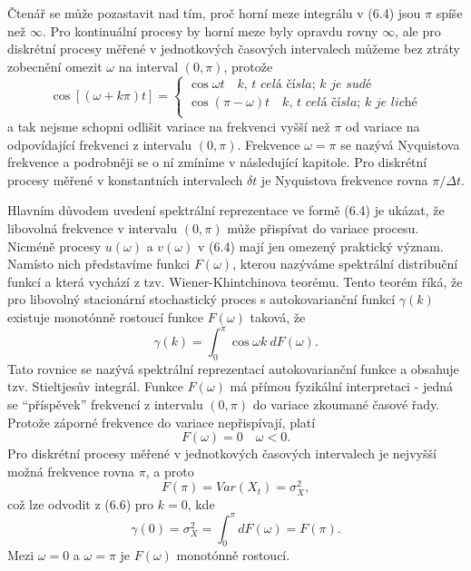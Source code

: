 Čtenář se může pozastavit nad tím, proč horní meze integrálu v (6.4) jsou $\pi$ spíše než $\infty$. Pro kontinuální procesy by horní meze byly opravdu rovny $\infty$, ale pro diskrétní procesy měřené v jednotkových časových intervalech můžeme bez ztráty zobecnění omezit $\omega$ na interval $(0, \pi)$, protože
\begin{equation}
\cos[(\omega + k \pi)t] = 
\begin{cases}
\cos \omega t \quad \textit{$k$, $t$ celá čísla; $k$ je sudé}\\
\cos(\pi - \omega)t \quad \textit{$k$, $t$ celá čísla; $k$ je liché}\\
\end{cases}
\end{equation}
a tak nejsme schopni odlišit variace na frekvenci vyšší než $\pi$ od variace na odpovídající frekvenci z intervalu $(0, \pi)$. Frekvence $\omega = \pi$ se nazývá Nyquistova frekvence a podrobněji se o ní zmíníme v následující kapitole. Pro diskrétní procesy měřené v konstantních intervalech $\delta t$ je Nyquistova frekvence rovna $\pi / \Delta t$.

Hlavním důvodem uvedení spektrální reprezentace ve formě (6.4) je ukázat, že libovolná frekvence v intervalu $(0, \pi)$ může přispívat do variace procesu. Nicméně procesy $u(\omega)$ a $v(\omega)$ v (6.4) mají jen omezený praktický význam. Namísto nich představíme funkci $F(\omega)$, kterou nazýváme spektrální distribuční funkcí a která vychází z tzv. Wiener-Khintchinova teorému. Tento teorém říká, že pro libovolný stacionární stochastický proces s autokovarianční funkcí $\gamma(k)$ existuje monotónně rostoucí funkce $F(\omega)$ taková, že
\begin{equation}
\gamma(k) = \int_0^{\pi} \cos \omega k ~ d F(\omega).
\end{equation}
Tato rovnice se nazývá spektrální reprezentací autokovarianční funkce a obsahuje tzv. Stieltjesův integrál. Funkce $F(\omega)$ má přímou fyzikální interpretaci - jedná se ``příspěvek'' frekvencí z intervalu $(0, \pi)$ do variace zkoumané časové řady. Protože záporné frekvence do variace nepřispívají, platí
\begin{equation}
F(\omega) = 0 \quad \omega < 0.
\end{equation}
Pro diskrétní procesy měřené v jednotkových časových intervalech je nejvyšší možná frekvence rovna $\pi$, a proto
\begin{equation}
F(\pi) = Var(X_t) = \sigma_X^2,
\end{equation} 
což lze odvodit z (6.6) pro $k = 0$, kde
\begin{equation}
\gamma(0) = \sigma_X^2 = \int_0^{\pi} dF(\omega) = F(\pi).
\end{equation}
Mezi $\omega = 0$ a $\omega = \pi$ je $F(\omega)$ monotónně rostoucí.

